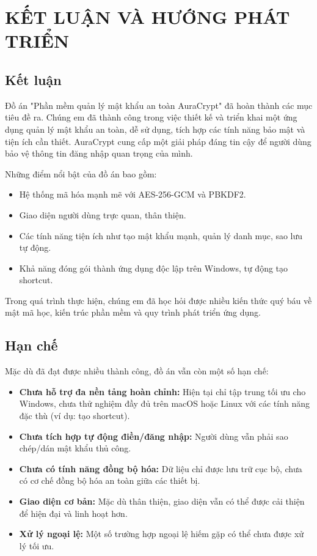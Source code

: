 \chapter{KẾT LUẬN VÀ HƯỚNG PHÁT TRIỂN}

\section{Kết luận}
Đồ án "Phần mềm quản lý mật khẩu an toàn AuraCrypt" đã hoàn thành các mục tiêu đề ra. Chúng em đã thành công trong việc thiết kế và triển khai một ứng dụng quản lý mật khẩu an toàn, dễ sử dụng, tích hợp các tính năng bảo mật và tiện ích cần thiết. AuraCrypt cung cấp một giải pháp đáng tin cậy để người dùng bảo vệ thông tin đăng nhập quan trọng của mình.

Những điểm nổi bật của đồ án bao gồm:
\begin{itemize}
    \item Hệ thống mã hóa mạnh mẽ với AES-256-GCM và PBKDF2.
    \item Giao diện người dùng trực quan, thân thiện.
    \item Các tính năng tiện ích như tạo mật khẩu mạnh, quản lý danh mục, sao lưu tự động.
    \item Khả năng đóng gói thành ứng dụng độc lập trên Windows, tự động tạo shortcut.
\end{itemize}
Trong quá trình thực hiện, chúng em đã học hỏi được nhiều kiến thức quý báu về mật mã học, kiến trúc phần mềm và quy trình phát triển ứng dụng.

\section{Hạn chế}
Mặc dù đã đạt được nhiều thành công, đồ án vẫn còn một số hạn chế:
\begin{itemize}
    \item \textbf{Chưa hỗ trợ đa nền tảng hoàn chỉnh:} Hiện tại chỉ tập trung tối ưu cho Windows, chưa thử nghiệm đầy đủ trên macOS hoặc Linux với các tính năng đặc thù (ví dụ: tạo shortcut).
    \item \textbf{Chưa tích hợp tự động điền/đăng nhập:} Người dùng vẫn phải sao chép/dán mật khẩu thủ công.
    \item \textbf{Chưa có tính năng đồng bộ hóa:} Dữ liệu chỉ được lưu trữ cục bộ, chưa có cơ chế đồng bộ hóa an toàn giữa các thiết bị.
    \item \textbf{Giao diện cơ bản:} Mặc dù thân thiện, giao diện vẫn có thể được cải thiện để hiện đại và linh hoạt hơn.
\item \textbf{Xử lý ngoại lệ:} Một số trường hợp ngoại lệ hiếm gặp có thể chưa được xử lý tối ưu.
\end{itemize}

